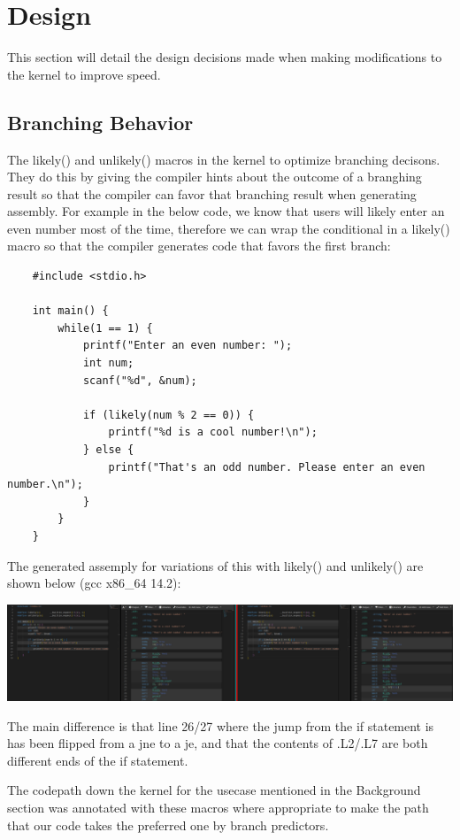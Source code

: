 \documentclass[11pt]{article}
\begin{document}
\section{Design}

This section will detail the design decisions made when making modifications to the kernel to improve speed.

\subsection{Branching Behavior}

The likely() and unlikely() macros in the kernel to optimize branching decisons. They do this by giving the compiler 
hints about the outcome of a branghing result so that the compiler can favor that branching result when generating 
assembly. For example in the below code, we know that users will likely enter an even number most of the time, therefore 
we can wrap the conditional in a likely() macro so that the compiler generates code that favors the first branch:

\begin{verbatim}
    #include <stdio.h>

    int main() {
        while(1 == 1) {
            printf("Enter an even number: ");
            int num;
            scanf("%d", &num);
    
            if (likely(num % 2 == 0)) {
                printf("%d is a cool number!\n");
            } else {
                printf("That's an odd number. Please enter an even number.\n");
            }
        }
    }
\end{verbatim}

The generated assemply for variations of this with likely() and unlikely() are shown below (gcc x86\_64 14.2):


\includegraphics[width=17cm]{./images/godbolt.png}

The main difference is that line 26/27 where the jump from the if statement is has been flipped from a jne to a je, and that 
the contents of .L2/.L7 are both different ends of the if statement. 

The codepath down the kernel for the usecase mentioned in the Background section was annotated with these macros where appropriate 
to make the path that our code takes the preferred one by branch predictors.
\end{document}
